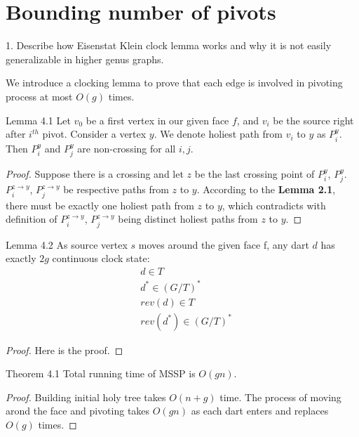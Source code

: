 \documentclass{article}
\begin{document}
\begin{figure}
\begin{subfigure}{.5\textwidth}
\end{subfigure}
\end{figure}

\newpage
\section{Bounding number of pivots}

\begin{center}
{\color{red}
1. Describe how Eisenstat Klein clock lemma works and why it is not easily
generalizable in higher genus graphs.}
\end{center}

We introduce a clocking lemma to prove that each edge is involved in pivoting 
process at most $O(g)$ times.

\begin{oneshot}{Lemma 4.1}
Let $v_0$ be a first vertex in our given face $f$, and $v_i$ be the source right
after $i^{th}$ pivot. Consider a vertex $y$. We denote holiest path from 
$v_i$ to $y$ as $P_i^{y}$. Then $P_i^{y}$ and $P_j^{y}$ are non-crossing for 
all $i, j$.
\end{oneshot}
\begin{proof}
Suppose there is a crossing and let $z$ be the last crossing point of $P_i^{y}$, $P_j^{y}$. $P_i^{z \rightarrow y}$, $P_j^{z \rightarrow y}$ be respective paths from $z$ to $y$. According to the \textbf{Lemma 2.1}, there must be exactly one holiest path from $z$ to $y$, which contradicts with definition of $P_i^{z \rightarrow y}$, $P_j^{z \rightarrow y}$ being distinct holiest paths from $z$ to $y$.
\end{proof}

\begin{oneshot}{Lemma 4.2}
As source vertex $s$ moves around the given face f, any dart $d$ has exactly
$2g$ continuous clock state: 
\begin{align*}
& d \in T \\
& d^{*} \in (G/T)^{*} \\
& rev(d) \in T \\
& rev(d^{*}) \in (G/T)^{*}
\end{align*}
\end{oneshot}
\begin{proof}
Here is the proof.
\end{proof}


\begin{oneshot}{Theorem 4.1}
Total running time of MSSP is $O(gn)$.
\end{oneshot}
\begin{proof}
Building initial holy tree takes $O(n + g)$ time. The process of moving arond the
face and pivoting takes $O(gn)$ as each dart enters and replaces $O(g)$ times.
\end{proof}
\end{document}
